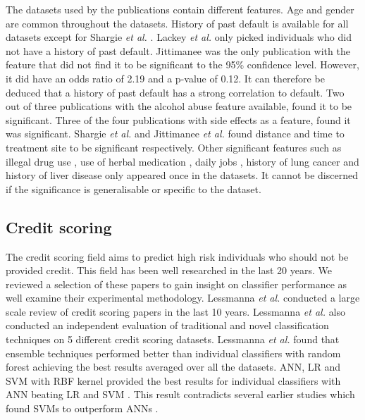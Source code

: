 \documentclass{sig-alternate-05-2015}
\begin{document}
	The datasets used by the publications contain different features. Age and gender are common throughout the datasets. History of past default is available for all datasets except for Shargie \textit{et al.} \cite{Shargie:10.1371/journal.pmed.0040037}. Lackey \textit{et al.} \cite{Lackey:10356751520150601} only picked individuals who did not have a history of past default. Jittimanee \cite{jittimanee:10.1111/j.1440-172X.2007.00650.x} was the only publication with the feature that did not find it to be significant to the 95\% confidence level. However, it did have an odds ratio of 2.19 and a p-value of 0.12. It can therefore be deduced that a history of past default has a strong correlation to default. Two out of three publications with the alcohol abuse feature available, found it to be significant. Three of the four publications with side effects as a feature, found it was significant. Shargie \textit{et al.} \cite{Shargie:10.1371/journal.pmed.0040037} and Jittimanee \textit{et al.} \cite{jittimanee:10.1111/j.1440-172X.2007.00650.x} found distance and time to treatment site to be significant respectively. Other significant features such as illegal drug use \cite{Lackey:10356751520150601}, use of herbal medication \cite{muture:6660173120110101}, daily jobs \cite{jittimanee:10.1111/j.1440-172X.2007.00650.x}, history of lung cancer \cite{chan:2003prevalence} and history of liver disease \cite{chan:2003prevalence} only appeared once in the datasets. It cannot be discerned if the significance is generalisable or specific to the dataset. 
	
	\subsection{Credit scoring}
	\label{credit-scoring-review}
	The credit scoring field aims to predict high risk individuals who should not be provided credit. This field has been well researched in the last 20 years. We reviewed a selection of these papers to gain insight on classifier performance as well examine their experimental methodology. Lessmanna \textit{et al.} \cite{lessmanna2013benchmarking} conducted a large scale review of credit scoring papers in the last 10 years. Lessmanna \textit{et al.} \cite{lessmanna2013benchmarking} also conducted an independent evaluation of traditional and novel classification techniques on 5 different credit scoring datasets. Lessmanna \textit{et al.} \cite{lessmanna2013benchmarking} found that ensemble techniques performed better than individual classifiers with random forest achieving the best results averaged over all the datasets. ANN, LR and SVM with RBF kernel provided the best results for individual classifiers with ANN beating LR and SVM \cite{lessmanna2013benchmarking}. This result contradicts several earlier studies which found SVMs to outperform ANNs \cite{Danenas20153194, Huang2007847, Huang2004543, Li2006772}. 
	
\end{document}
